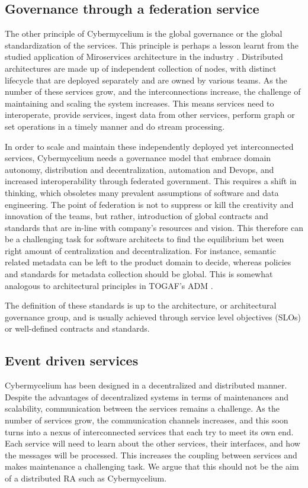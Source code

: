 \documentclass[review]{elsarticle}
\begin{document}
\subsection{Governance through a federation service}

The other principle of Cybermycelium is the global governance or the global standardization of the services. This principle is perhaps a lesson learnt from the studied application of Miroservices architecture in the industry \cite{alshuqayran2016systematic}. Distributed architectures are made up of independent collection of nodes, with distinct lifecycle that are deployed separately and are owned by various teams. As the number of these services grow, and the interconnections increase, the challenge of maintaining and scaling the system increases. This means services need to interoperate, provide services, ingest data from other services, perform graph or set operations in a timely manner and do stream processing.

In order to scale and maintain these independently deployed yet interconnected services, Cybermycelium needs a governance model that embrace domain autonomy, distribution and decentralization, automation and Devops, and increased interoperability through federated government. This requires a shift in thinking, which obsoletes many prevalent assumptions of software and data engineering. The point of federation is not to suppress or kill the creativity and innovation of the teams, but rather, introduction of global contracts and standards that are in-line with company's resources and vision. This therefore can be a challenging task for software architects to find the  equilibrium bet ween right amount of centralization and decentralization. For instance, semantic related metadata can be left to the product domain to decide, whereas policies and standards for metadata collection should be global. This is somewhat analogous to architectural principles in TOGAF's ADM \cite{josey2016togaf}.

The definition of these standards is up to the architecture, or architectural governance group, and is usually achieved through service level objectives (SLOs) or well-defined contracts and standards.

\subsection{Event driven services}

Cybermycelium has been designed in a decentralized and distributed manner. Despite the advantages of decentralized systems in terms of maintenances and scalability, communication between the services remains a challenge. As the number of services grow, the communication channels increases, and this soon turns into a nexus of interconnected services that each try to meet its own end. Each service will need to learn about the other services, their interfaces, and how the messages will be processed. This increases the coupling between services and makes maintenance a challenging task. We argue that this should not be the aim of a distributed RA such as Cybermycelium.
\end{document}
